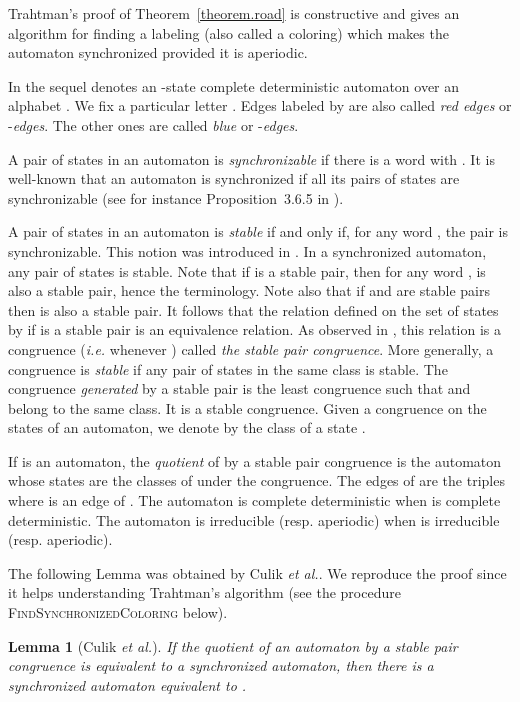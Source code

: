 \documentclass[11pt,a4paper]{article}
\newtheorem{lemma}[theorem]{Lemma}
\newcommand{\ie}{{\itshape i.e.}\xspace }
\newcommand{\etal}{{\itshape et al.}\xspace }
\newcommand{\resp}{{resp.}\xspace }
\begin{document}
Trahtman's proof of Theorem~\ref{theorem.road} is constructive and
gives an algorithm for finding a labeling (also called a coloring) which
makes the automaton synchronized provided it is aperiodic.

In the sequel  denotes an -state complete deterministic
automaton over an alphabet . We fix a particular letter .
Edges labeled by  are also called \emph{red edges} or
-\emph{edges}. The other ones are called \emph{blue} or
-\emph{edges}.


A pair  of states in an automaton is \emph{synchronizable} if
there is a word  with .  It is well-known
that an automaton is synchronized if all its pairs of states are
synchronizable (see for instance Proposition~3.6.5 in
\cite{BerstelPerrinReutenauer2010}). 

A pair  of states in an automaton is \emph{stable} if and only
if, for any word , the pair  is
synchronizable. This notion was introduced in \cite{CulikEtAl1999}.
In a synchronized automaton, any pair of states is stable.  Note that
if  is a stable pair, then for any word ,  is also a stable pair, hence the terminology. Note also that
if  and  are stable pairs then  is also a stable
pair. It follows that the relation defined on the set of states by  if  is a stable pair is an equivalence relation. As
observed in \cite[Lemma~2]{Kari03}, this relation is a congruence (\ie
 whenever ) called \emph{the
  stable pair congruence}.  More generally, a congruence is
\emph{stable} if any pair of states in the same class is stable. The
congruence \emph{generated} by a stable pair  is the least
congruence such that  and  belong to the same class. It is a
stable congruence. Given a congruence on the states of an automaton,
we denote by  the class of a state .


If  is an automaton, the \emph{quotient} of  by a stable
pair congruence is the automaton  whose states are the classes of
 under the congruence. The edges of  are the triples
 where  is an edge of .  The
automaton  is complete deterministic when  is complete
deterministic. The automaton  is irreducible (\resp aperiodic)
when  is irreducible (\resp aperiodic).

The following Lemma was obtained by Culik \etal \cite{CulikEtAl02}.
We reproduce the proof since it helps understanding Trahtman's algorithm
(see the procedure \textsc{FindSynchronizedColoring} below).

\begin{lemma}[Culik \etal \cite{CulikEtAl02}] \label{lemma.lift} If
  the quotient of an automaton  by a stable pair congruence
  is equivalent to a synchronized automaton, then there is a
  synchronized automaton equivalent to .
\end{lemma}
\end{document}
